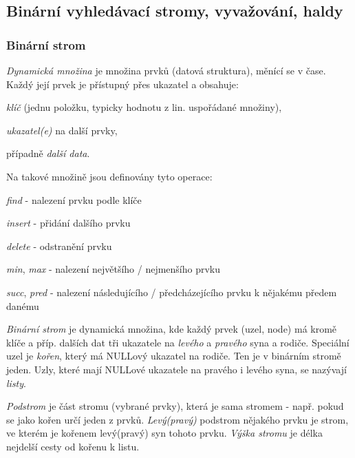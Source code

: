 \def\b#1{\mathbf{#1}}


\subsection{Binární vyhledávací stromy, vyvažování, haldy}

\subsubsection*{Binární strom}

\begin{definice}
\emph{Dynamická množina} je množina prvků (datová struktura), měnící se v čase. Každý její prvek je přístupný přes ukazatel a obsahuje:
\begin{pitemize}
    \item \emph{klíč} (jednu položku, typicky hodnotu z lin. uspořádané množiny), 
    \item \emph{ukazatel(e)} na další prvky, 
    \item případně \emph{další data}.
\end{pitemize}
Na takové množině jsou definovány tyto operace:
\begin{pitemize}
    \item \emph{find} - nalezení prvku podle klíče
    \item \emph{insert} - přidání dalšího prvku
    \item \emph{delete} - odstranění prvku
    \item \emph{min}, \emph{max} - nalezení největšího / nejmenšího prvku
    \item \emph{succ}, \emph{pred} - nalezení následujícího / předcházejícího prvku k nějakému předem danému
\end{pitemize}
\end{definice}


\begin{definice}
\emph{Binární strom} je dynamická množina, kde každý prvek (uzel, node) má kromě klíče a příp. dalších dat tři ukazatele na \emph{levého} a \emph{pravého} syna a rodiče. Speciální uzel je \emph{kořen}, který má NULLový ukazatel na rodiče. Ten je v binárním stromě jeden. Uzly, které mají NULLové ukazatele na pravého i levého syna, se nazývají \emph{listy}.

\emph{Podstrom} je část stromu (vybrané prvky), která je sama stromem - např. pokud se jako kořen určí jeden z prvků. \emph{Levý(pravý)} podstrom nějakého prvku je strom, ve kterém je kořenem levý(pravý) syn tohoto prvku. \emph{Výška stromu} je délka nejdelší cesty od kořenu k listu.
\end{definice}

